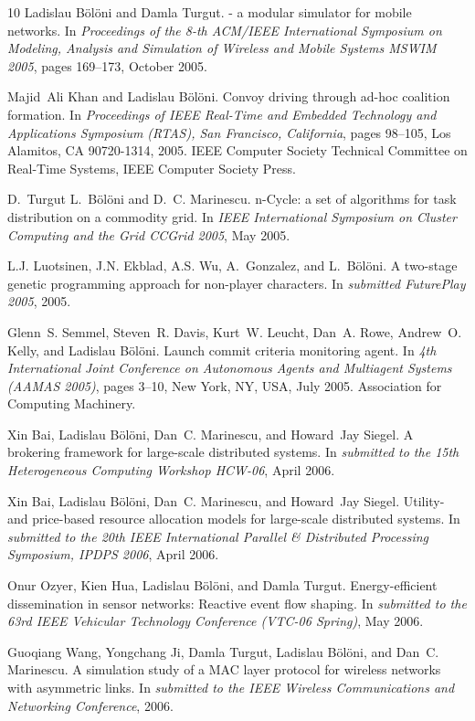 \begin{thebibliography}{10}
Ladislau B{\"o}l{\"o}ni and Damla Turgut.
 - a modular simulator for mobile networks.
\newblock In {\em Proceedings of the 8-th ACM/IEEE International Symposium on
  Modeling, Analysis and Simulation of Wireless and Mobile Systems MSWIM 2005},
  pages 169--173, October 2005.

Majid~Ali Khan and Ladislau B{\"o}l{\"o}ni.
\newblock Convoy driving through ad-hoc coalition formation.
\newblock In {\em Proceedings of IEEE Real-Time and Embedded Technology and
  Applications Symposium (RTAS), San Francisco, California}, pages 98--105, Los
  Alamitos, CA 90720-1314, 2005. IEEE Computer Society Technical Committee on
  Real-Time Systems, IEEE Computer Society Press.

D.~Turgut L.~B{\"o}l{\"o}ni and D.~C. Marinescu.
\newblock n-{C}ycle: a set of algorithms for task distribution on a commodity
  grid.
\newblock In {\em IEEE International Symposium on Cluster Computing and the
  Grid CCGrid 2005}, May 2005.

L.J. Luotsinen, J.N. Ekblad, A.S. Wu, A.~Gonzalez, and L.~B{\"o}l{\"o}ni.
\newblock A two-stage genetic programming approach for non-player characters.
\newblock In {\em submitted FuturePlay 2005}, 2005.

Glenn~S. Semmel, Steven~R. Davis, Kurt~W. Leucht, Dan~A. Rowe, Andrew~O. Kelly,
  and Ladislau B\"ol\"oni.
\newblock Launch commit criteria monitoring agent.
\newblock In {\em 4th International Joint Conference on Autonomous Agents and
  Multiagent Systems (AAMAS 2005)}, pages 3--10, New York, NY, USA, July 2005.
  Association for Computing Machinery.

Xin Bai, Ladislau B{\"o}l{\"o}ni, Dan~C. Marinescu, and Howard~Jay Siegel.
\newblock A brokering framework for large-scale distributed systems.
\newblock In {\em submitted to the 15th Heterogeneous Computing Workshop
  HCW-06}, April 2006.

Xin Bai, Ladislau B{\"o}l{\"o}ni, Dan~C. Marinescu, and Howard~Jay Siegel.
\newblock Utility- and price-based resource allocation models for large-scale
  distributed systems.
\newblock In {\em submitted to the 20th IEEE International Parallel \&
  Distributed Processing Symposium, IPDPS 2006}, April 2006.

Onur Ozyer, Kien Hua, Ladislau B{\"o}l{\"o}ni, and Damla Turgut.
\newblock Energy-efficient dissemination in sensor networks: Reactive event
  flow shaping.
\newblock In {\em submitted to the 63rd IEEE Vehicular Technology Conference
  (VTC-06 Spring)}, May 2006.

Guoqiang Wang, Yongchang Ji, Damla Turgut, Ladislau B{\"o}l{\"o}ni, and Dan~C.
  Marinescu.
\newblock A simulation study of a {MAC} layer protocol for wireless networks
  with asymmetric links.
\newblock In {\em submitted to the IEEE Wireless Communications and Networking
  Conference}, 2006.

\end{thebibliography}
